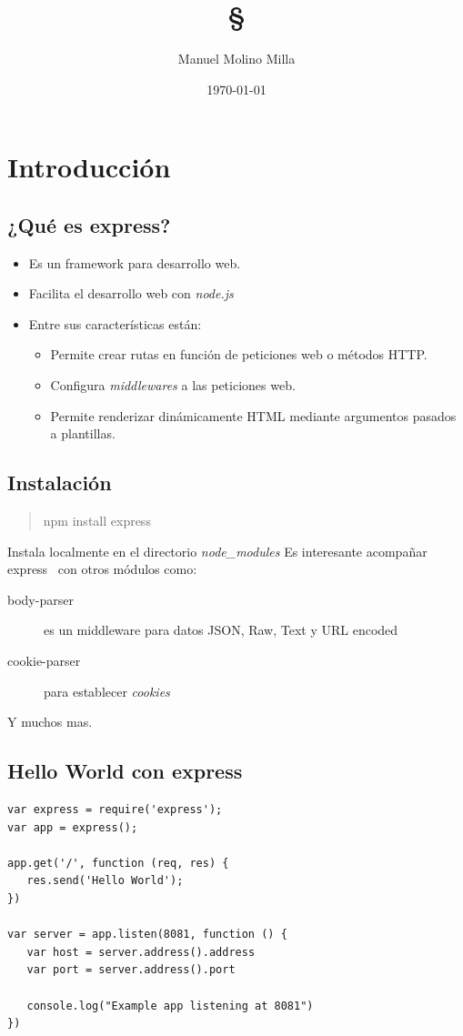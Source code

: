 \documentclass[4paper]{article}
\author{Manuel Molino Milla}
\title{\textbf{\S}}
\date{\today}
\newcommand{\s}{express}
\begin{document}
\maketitle 
\tableofcontents
\newpage

\section{Introducción}
\subsection{¿Qué es \s?}
\begin{itemize}
\item Es un framework para desarrollo web.
\item Facilita el desarrollo web con \emph{node.js}
\item Entre sus características están:
\begin{itemize}
\item Permite crear rutas en función de peticiones web o métodos HTTP.
\item Configura \emph{middlewares} a las peticiones web.
\item Permite renderizar dinámicamente HTML mediante argumentos pasados a plantillas.
\end{itemize}
\end{itemize}

\subsection{Instalación}
\begin{quote}
npm install express
\end{quote}
Instala localmente en el directorio \emph{node\_modules}
Es interesante acompañar \s ~ con otros módulos como:
\begin{description}
\item[body-parser] es un middleware para datos JSON, Raw, Text y URL encoded
\item[cookie-parser] para establecer \emph{cookies}
\end{description}
Y muchos mas.
\subsection{Hello World con \s}
\begin{verbatim}
var express = require('express');
var app = express();

app.get('/', function (req, res) {
   res.send('Hello World');
})

var server = app.listen(8081, function () {
   var host = server.address().address
   var port = server.address().port
   
   console.log("Example app listening at 8081")
})
\end{verbatim}
\end{document}
